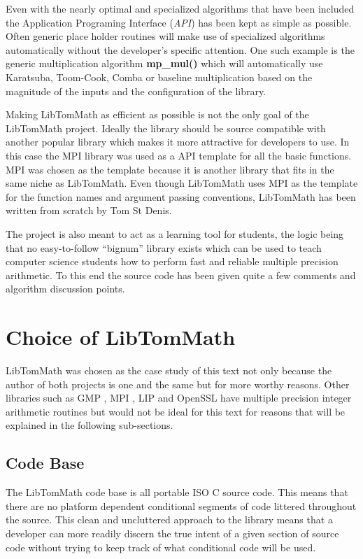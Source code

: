 \documentclass[b5paper]{book}
\begin{document}
Even with the nearly optimal and specialized algorithms that have been included the Application Programing Interface 
(\textit{API}) has been kept as simple as possible.  Often generic place holder routines will make use of specialized 
algorithms automatically without the developer's specific attention.  One such example is the generic multiplication 
algorithm \textbf{mp\_mul()} which will automatically use Karatsuba, Toom-Cook, Comba or baseline multiplication 
based on the magnitude of the inputs and the configuration of the library.  

Making LibTomMath as efficient as possible is not the only goal of the LibTomMath project.  Ideally the library should 
be source compatible with another popular library which makes it more attractive for developers to use.  In this case the
MPI library was used as a API template for all the basic functions.  MPI was chosen as the template because it is 
another library that fits in the same niche as LibTomMath.  Even though LibTomMath uses MPI as the template for the 
function names and argument passing conventions, LibTomMath has been written from scratch by Tom St Denis.

The project is also meant to act as a learning tool for students, the logic being that no easy-to-follow ``bignum'' 
library exists which can be used to teach computer science students how to perform fast and reliable multiple precision 
arithmetic.  To this end the source code has been given quite a few comments and algorithm discussion points.  

\section{Choice of LibTomMath}
LibTomMath was chosen as the case study of this text not only because the author of both projects is one and the same but
for more worthy reasons.  Other libraries such as GMP \cite{GMP}, MPI \cite{MPI}, LIP \cite{LIP} and OpenSSL 
\cite{OPENSSL} have multiple precision integer arithmetic routines but would not be ideal for this text for 
reasons that will be explained in the following sub-sections.

\subsection{Code Base}
The LibTomMath code base is all portable ISO C source code.  This means that there are no platform dependent conditional
segments of code littered throughout the source.  This clean and uncluttered approach to the library means that a
developer can more readily discern the true intent of a given section of source code without trying to keep track of
what conditional code will be used.
\end{document}
